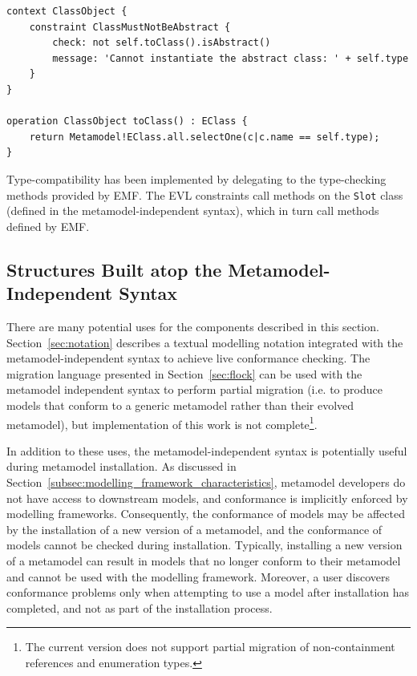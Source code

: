 \begin{lstlisting}[caption=A constraint (in EVL) to check that only concrete metamodel types are instantiated., label=lst:conformance_constraint, language=EVL]
context ClassObject {
	constraint ClassMustNotBeAbstract {
		check: not self.toClass().isAbstract()
		message: 'Cannot instantiate the abstract class: ' + self.type
	}
}

operation ClassObject toClass() : EClass {
	return Metamodel!EClass.all.selectOne(c|c.name == self.type);
}
\end{lstlisting}

Type-compatibility has been implemented by delegating to the type-checking methods provided by EMF. The EVL constraints call methods on the \texttt{Slot} class (defined in the metamodel-independent syntax), which in turn call methods defined by EMF.

\subsection{Structures Built atop the Metamodel-Independent Syntax}
There are many potential uses for the components described in this section. Section~\ref{sec:notation} describes a textual modelling notation integrated with the metamodel-independent syntax to achieve live conformance checking. The migration language presented in Section~\ref{sec:flock} can be used with the metamodel independent syntax to perform partial migration (i.e. to produce models that conform to a generic metamodel rather than their evolved metamodel), but implementation of this work is not complete\footnote{The current version does not support partial migration of non-containment references and enumeration types.}.

In addition to these uses, the metamodel-independent syntax is potentially useful during metamodel installation. As discussed in Section~\ref{subsec:modelling_framework_characteristics}, metamodel developers do not have access to downstream models, and conformance is implicitly enforced by modelling frameworks. Consequently, the conformance of models may be affected by the installation of a new version of a metamodel, and the conformance of models cannot be checked during installation. Typically, installing a new version of a metamodel can result in models that no longer conform to their metamodel and cannot be used with the modelling framework. Moreover, a user discovers conformance problems only when attempting to use a model after installation has completed, and not as part of the installation process.

